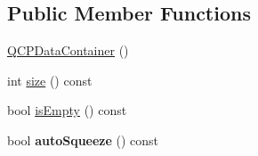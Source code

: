 \subsection*{Public Member Functions}
\begin{DoxyCompactItemize}
\item 
\hyperlink{class_q_c_p_data_container_af86c0c63719f92c360ff67cc06c6fe6f}{Q\+C\+P\+Data\+Container} ()
\item 
int \hyperlink{class_q_c_p_data_container_a09003591d8812dea7a548c500b62750a}{size} () const 
\item 
bool \hyperlink{class_q_c_p_data_container_af2a4d189394da4a3e78bf52ff6945f1d}{is\+Empty} () const 
\item 
bool {\bfseries auto\+Squeeze} () const \hypertarget{class_q_c_p_data_container_a998f6e133f162f32818ca529a0be7355}{}\label{class_q_c_p_data_container_a998f6e133f162f32818ca529a0be7355}


\end{DoxyCompactItemize}
